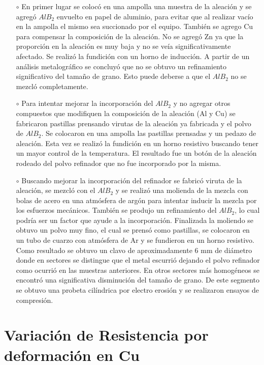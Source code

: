 \documentclass[a4paper,12pt,fleqn,twoside,openany]{book}
\begin{document}
\begin{itemize}
\item[$\circ$] En primer lugar se colocó en una ampolla una muestra de la aleación y se agregó $AlB_2$ envuelto en papel de aluminio, para evitar que al 
realizar vacío en la ampolla el mismo sea succionado por el equipo. También se agrego Cu para compensar la composición de la aleación. No se agregó Zn 
ya que la proporción en la aleación es muy baja y no se veía significativamente afectado. Se realizó la fundición con un horno de inducción. A partir 
de un análisis metalográfico se concluyó que no se obtuvo un refinamiento significativo del tamaño de grano. Esto puede deberse a que el $AlB_2$ no se 
mezcló completamente.
\item[$\circ$] Para intentar mejorar la incorporación del $AlB_2$ y no agregar otros compuestos que modifiquen la composición de la aleación (Al y Cu) 
se fabricaron pastillas prensando virutas de la aleación ya fabricada y el polvo de $AlB_2$. Se colocaron en una ampolla las pastillas prensadas y un 
pedazo de aleación. Esta vez se realizó la fundición en un horno resistivo buscando tener un mayor control de la temperatura. El resultado fue un botón 
de la aleación rodeado del polvo refinador que no fue incorporado por la misma. 
\item[$\circ$] Buscando mejorar la incorporación del refinador se fabricó viruta de la aleación, se mezcló con el $AlB_2$ y se realizó una molienda de 
la mezcla con bolas de acero en una atmósfera de argón para intentar inducir la mezcla por los esfuerzos mecánicos. También se produjo un refinamiento 
del $AlB_2$, lo cual podría ser un factor que ayude a la incorporación. Finalizada la moliendo se obtuvo un polvo muy fino, el cual se prensó como 
pastillas, se colocaron en un tubo de cuarzo con atmósfera de Ar y se fundieron en un horno resistivo. Como resultado se obtuvo un clavo de aproximadamente 
6 mm de diámetro donde en sectores se distingue que el metal escurrió dejando el polvo refinador como ocurrió en las muestras anteriores. En otros 
sectores más homogéneos se encontró una significativa disminución del tamaño de grano. De este segmento se obtuvo una probeta 
cilíndrica por electro erosión y se realizaron ensayos de compresión. %
\end{itemize}



\section{Variación de Resistencia por deformación en Cu}
\end{document}
